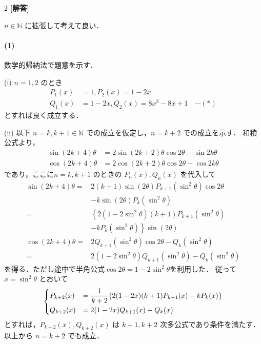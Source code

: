 \documentclass[../../main.tex]{subfiles}
\begin{document}
\setcounter{equation}{0}
\setcounter{figure}{0}
\setcounter{table}{0}
\begin{oframed}
  
\end{oframed}
\setlength{\columnseprule}{0.4pt}
\begin{multicols}{2}
  {\bf [解答]}

  $n \in \mathbb{N}$ に拡張して考えて良い．

  \paragraph{(1)}

  数学的帰納法で題意を示す．

  (i)
  $n=1, 2$ のとき
  \begin{align}
    P_1(x) & = 1, P_2(x) = 1-2x                              \\
    Q_1(x) & = 1-2x, Q_2(x) = 8x^2 - 8x + 1 \quad \cdots (*)
  \end{align}
  とすれば良く成立する．

  (ii)
  以下 $n=k, k+1 \in \mathbb{N}$ での成立を仮定し，$n=k+2$ での成立を示す．
  和積公式より，
  \begin{align}
    \sin(2k+4)\theta
    & = 2\sin(2k+2)\theta\cos2\theta - \sin2k\theta \\
    \cos(2k+4)\theta
    & = 2\cos(2k+2)\theta\cos2\theta - \cos2k\theta
  \end{align}
  であり，ここに$n=k, k+1$ のときの $P_n(x), Q_n(x)$ を代入して
  \begin{align}
    \sin(2k+4)\theta
    = & 2 (k+1) \sin(2\theta) P_{k+1}(\sin^2\theta) \cos 2\theta    \\
    & - k \sin(2\theta) P_k(\sin^2\theta)                       \\
    = & \left\{2(1-2\sin^2\theta)(k+1)P_{k+1}(\sin^2\theta) \right. \\
    & \left. - kP_k(\sin^2\theta)\right\}\sin(2\theta)            \\
    \cos(2k+4)\theta
    = & 2Q_{k+1}(\sin^2\theta)\cos2\theta - Q_{k}(\sin^2\theta)     \\
    = & 2(1-2\sin^2\theta)Q_{k+1}(\sin^2\theta) - Q_k(\sin^2\theta)
  \end{align}
  を得る．ただし途中で半角公式$\cos2\theta = 1-2\sin^2\theta$を利用した．
  従って$x=\sin^2\theta$ とおいて
  \begin{align}\label{eq:1}
    \begin{dcases}
      P_{k+2}(x) & = \dfrac{1}{k+2}\{2(1-2x)(k+1)P_{k+1}(x) - kP_k(x)\} \\
      Q_{k+2}(x) & = 2(1-2x)Q_{k+1}(x) - Q_k(x)
    \end{dcases}
  \end{align}
  とすれば，$P_{k+2}(x), Q_{k+2}(x)$ は $k+1, k+2$ 次多公式であり条件を満たす．以上から $n=k+2$ でも成立．


\end{multicols}
\end{document}
